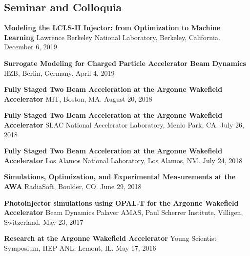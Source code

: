 \documentclass[11pt,a4paper,sans]{moderncv}        %
\begin{document}
\subsection{Seminar and Colloquia}
\textbf{Modeling the LCLS-II Injector: from Optimization to Machine Learning}\newline
Lawrence Berkeley National Laboratory, Berkeley, California. December 6, 2019
\vspace{0.3em}

\textbf{Surrogate Modeling for Charged Particle Accelerator Beam Dynamics}\newline
HZB, Berlin, Germany. April 4, 2019
\vspace{0.3em}

\textbf{Fully Staged Two Beam Acceleration at the Argonne Wakefield Accelerator}\newline
MIT, Boston, MA. August 20, 2018 
\vspace{0.3em}

\textbf{Fully Staged Two Beam Acceleration at the Argonne Wakefield Accelerator}\newline
SLAC National Accelerator Laboratory, Menlo Park, CA. July 26, 2018 
\vspace{0.3em}

\textbf{Fully Staged Two Beam Acceleration at the Argonne Wakefield Accelerator}\newline
Los Alamos National Laboratory, Los Alamos, NM. July 24, 2018 
\vspace{0.3em}

\textbf{Simulations, Optimization, and Experimental Measurements at the AWA}\newline
RadiaSoft, Boulder, CO. June 29, 2018 
\vspace{0.3em}

\textbf{Photoinjector simulations using OPAL-T for the Argonne Wakefield Accelerator}\newline
Beam Dynamics Palaver AMAS, Paul Scherrer Institute, Villigen, Switzerland. May 23, 2017 
\vspace{0.3em}

\textbf{Research at the Argonne Wakefield Accelerator}\newline
Young Scientist Symposium, HEP ANL, Lemont, IL. May 17, 2016 
\vspace{0.3em}
\end{document}
